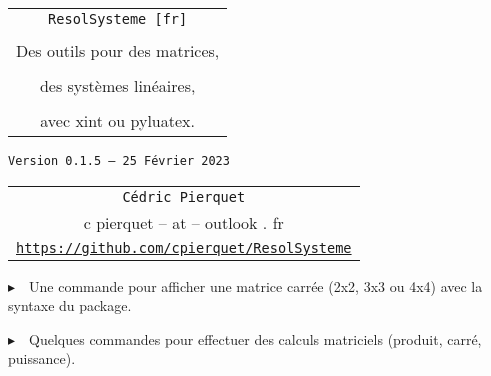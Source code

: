 \documentclass[french,a4paper,11pt]{article}
\def\TPversion{0.1.5}
\def\TPdate{25 Février 2023}
\begin{document}
\setlength{\aweboxleftmargin}{0.07\linewidth}
\setlength{\aweboxcontentwidth}{0.93\linewidth}
\setlength{\aweboxvskip}{8pt}

\pagestyle{fancy}

\thispagestyle{empty}

\vspace{2cm}

\begin{center}
	\begin{minipage}{0.75\linewidth}
	\begin{tcolorbox}[colframe=yellow,colback=yellow!15]
		\begin{center}
			\begin{tabular}{c}
				{\Huge \texttt{ResolSysteme [fr]}}\\
				\\
				{\LARGE Des outils pour des matrices, } \\
				\\
				{\LARGE des systèmes linéaires,} \\
				\\
				{\LARGE avec xint ou pyluatex.} \\
			\end{tabular}
			
			\bigskip
			
			{\small \texttt{Version \TPversion{} -- \TPdate}}
		\end{center}
	\end{tcolorbox}
\end{minipage}
\end{center}

\begin{center}
	\begin{tabular}{c}
	\texttt{Cédric Pierquet}\\
	{\ttfamily c pierquet -- at -- outlook . fr}\\
	\texttt{\url{https://github.com/cpierquet/ResolSysteme}}
\end{tabular}
\end{center}

\vspace{0.25cm}

{$\blacktriangleright$~~Une commande pour afficher une matrice carrée (2x2, 3x3 ou 4x4) avec la syntaxe du package.}

\smallskip

{$\blacktriangleright$~~Quelques commandes pour effectuer des calculs matriciels (produit, carré, puissance).}

\smallskip
\end{document}
